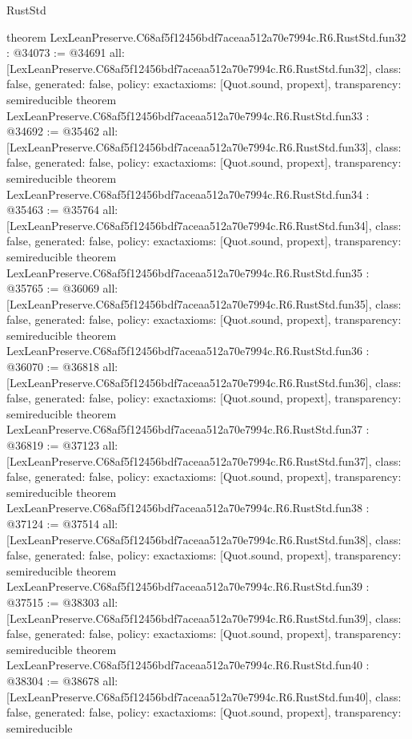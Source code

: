 \begin{lexlean}{RustStd}
\begin{coremodule}
{}
theorem LexLeanPreserve.C68af5f12456bdf7aceaa512a70e7994c.R6.RustStd.fun32 : @34073 := @34691 {
  all: [LexLeanPreserve.C68af5f12456bdf7aceaa512a70e7994c.R6.RustStd.fun32],
  class: false,
  generated: false,
  policy: exact{axioms: [Quot.sound, propext]},
  transparency: semireducible
}
theorem LexLeanPreserve.C68af5f12456bdf7aceaa512a70e7994c.R6.RustStd.fun33 : @34692 := @35462 {
  all: [LexLeanPreserve.C68af5f12456bdf7aceaa512a70e7994c.R6.RustStd.fun33],
  class: false,
  generated: false,
  policy: exact{axioms: [Quot.sound, propext]},
  transparency: semireducible
}
theorem LexLeanPreserve.C68af5f12456bdf7aceaa512a70e7994c.R6.RustStd.fun34 : @35463 := @35764 {
  all: [LexLeanPreserve.C68af5f12456bdf7aceaa512a70e7994c.R6.RustStd.fun34],
  class: false,
  generated: false,
  policy: exact{axioms: [Quot.sound, propext]},
  transparency: semireducible
}
theorem LexLeanPreserve.C68af5f12456bdf7aceaa512a70e7994c.R6.RustStd.fun35 : @35765 := @36069 {
  all: [LexLeanPreserve.C68af5f12456bdf7aceaa512a70e7994c.R6.RustStd.fun35],
  class: false,
  generated: false,
  policy: exact{axioms: [Quot.sound, propext]},
  transparency: semireducible
}
theorem LexLeanPreserve.C68af5f12456bdf7aceaa512a70e7994c.R6.RustStd.fun36 : @36070 := @36818 {
  all: [LexLeanPreserve.C68af5f12456bdf7aceaa512a70e7994c.R6.RustStd.fun36],
  class: false,
  generated: false,
  policy: exact{axioms: [Quot.sound, propext]},
  transparency: semireducible
}
theorem LexLeanPreserve.C68af5f12456bdf7aceaa512a70e7994c.R6.RustStd.fun37 : @36819 := @37123 {
  all: [LexLeanPreserve.C68af5f12456bdf7aceaa512a70e7994c.R6.RustStd.fun37],
  class: false,
  generated: false,
  policy: exact{axioms: [Quot.sound, propext]},
  transparency: semireducible
}
theorem LexLeanPreserve.C68af5f12456bdf7aceaa512a70e7994c.R6.RustStd.fun38 : @37124 := @37514 {
  all: [LexLeanPreserve.C68af5f12456bdf7aceaa512a70e7994c.R6.RustStd.fun38],
  class: false,
  generated: false,
  policy: exact{axioms: [Quot.sound, propext]},
  transparency: semireducible
}
theorem LexLeanPreserve.C68af5f12456bdf7aceaa512a70e7994c.R6.RustStd.fun39 : @37515 := @38303 {
  all: [LexLeanPreserve.C68af5f12456bdf7aceaa512a70e7994c.R6.RustStd.fun39],
  class: false,
  generated: false,
  policy: exact{axioms: [Quot.sound, propext]},
  transparency: semireducible
}
theorem LexLeanPreserve.C68af5f12456bdf7aceaa512a70e7994c.R6.RustStd.fun40 : @38304 := @38678 {
  all: [LexLeanPreserve.C68af5f12456bdf7aceaa512a70e7994c.R6.RustStd.fun40],
  class: false,
  generated: false,
  policy: exact{axioms: [Quot.sound, propext]},
  transparency: semireducible
}
\end{coremodule}
\end{lexlean}
